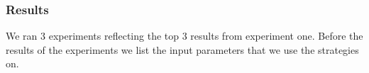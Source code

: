 \begin{table}[H]
\centering  %
\caption{Slope calculation stack size} %
\label{table:CurveTest} %
\end{table}

\subsubsection{Results}
We ran 3 experiments reflecting the top 3 results from experiment one. Before the results of the experiments we list the input parameters that we use the strategies on. 

